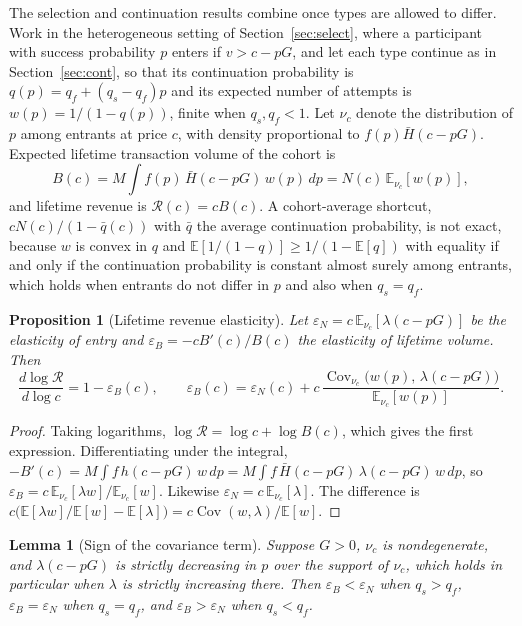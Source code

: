 \documentclass[11pt]{article}
\newtheorem{proposition}{Proposition}
\newtheorem{lemma}{Lemma}
\theoremstyle{remark}
\newcommand{\E}{\mathbb{E}}
\newcommand{\Hbar}{\bar H}
\begin{document}
The selection and continuation results combine once types are allowed to differ. Work in the heterogeneous setting of Section~\ref{sec:select}, where a participant with success probability $p$ enters if $v>c-pG$, and let each type continue as in Section~\ref{sec:cont}, so that its continuation probability is $q(p)=q_f+(q_s-q_f)p$ and its expected number of attempts is $w(p)=1/(1-q(p))$, finite when $q_s,q_f<1$. Let $\nu_c$ denote the distribution of $p$ among entrants at price $c$, with density proportional to $f(p)\Hbar(c-pG)$. Expected lifetime transaction volume of the cohort is
\[
B(c)=M\!\int f(p)\,\Hbar(c-pG)\,w(p)\,dp = N(c)\,\E_{\nu_c}[w(p)],
\]
and lifetime revenue is $\mathcal R(c)=cB(c)$. A cohort-average shortcut, $cN(c)/(1-\bar q(c))$ with $\bar q$ the average continuation probability, is not exact, because $w$ is convex in $q$ and $\E[1/(1-q)]\ge 1/(1-\E[q])$ with equality if and only if the continuation probability is constant almost surely among entrants, which holds when entrants do not differ in $p$ and also when $q_s=q_f$.

\begin{proposition}[Lifetime revenue elasticity]\label{prop:decomp}
Let $\varepsilon_N=c\,\E_{\nu_c}[\lambda(c-pG)]$ be the elasticity of entry and $\varepsilon_B=-cB'(c)/B(c)$ the elasticity of lifetime volume. Then
\[
\frac{d\log\mathcal R}{d\log c}=1-\varepsilon_B(c),
\qquad
\varepsilon_B(c)=\varepsilon_N(c)+c\,\frac{\operatorname{Cov}_{\nu_c}\bigl(w(p),\,\lambda(c-pG)\bigr)}{\E_{\nu_c}[w(p)]} .
\]
\end{proposition}

\begin{proof}
Taking logarithms, $\log\mathcal R=\log c+\log B(c)$, which gives the first expression. Differentiating under the integral, $-B'(c)=M\!\int f\,h(c-pG)\,w\,dp=M\!\int f\,\Hbar(c-pG)\,\lambda(c-pG)\,w\,dp$, so $\varepsilon_B=c\,\E_{\nu_c}[\lambda w]/\E_{\nu_c}[w]$. Likewise $\varepsilon_N=c\,\E_{\nu_c}[\lambda]$. The difference is $c\bigl(\E[\lambda w]/\E[w]-\E[\lambda]\bigr)=c\operatorname{Cov}(w,\lambda)/\E[w]$.
\end{proof}

\begin{lemma}[Sign of the covariance term]\label{lem:cov}
Suppose $G>0$, $\nu_c$ is nondegenerate, and $\lambda(c-pG)$ is strictly decreasing in $p$ over the support of $\nu_c$, which holds in particular when $\lambda$ is strictly increasing there. Then $\varepsilon_B<\varepsilon_N$ when $q_s>q_f$, $\varepsilon_B=\varepsilon_N$ when $q_s=q_f$, and $\varepsilon_B>\varepsilon_N$ when $q_s<q_f$.
\end{lemma}
\end{document}
